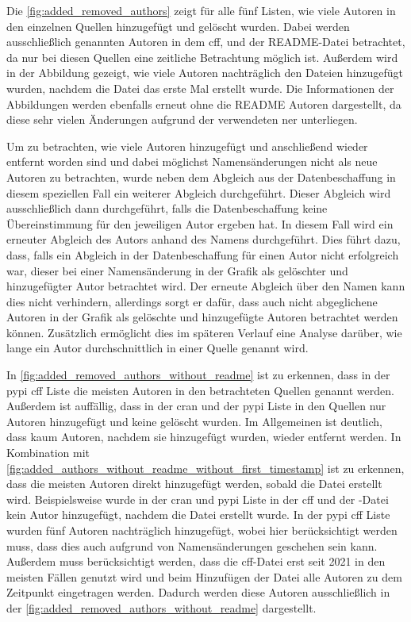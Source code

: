 Die \autoref{fig:added_removed_authors} zeigt für alle fünf Listen, wie viele Autoren in den einzelnen Quellen hinzugefügt und gelöscht wurden.
Dabei werden ausschließlich genannten Autoren in dem \gls{cff},  und der README-Datei betrachtet, da nur bei diesen Quellen eine zeitliche Betrachtung möglich ist.
Außerdem wird in der Abbildung gezeigt, wie viele Autoren nachträglich den Dateien hinzugefügt wurden, nachdem die Datei das erste Mal erstellt wurde.
Die Informationen der Abbildungen werden ebenfalls erneut ohne die README Autoren dargestellt, da diese sehr vielen Änderungen aufgrund der verwendeten \gls{ner} unterliegen.

Um zu betrachten, wie viele Autoren hinzugefügt und anschließend wieder entfernt worden sind und dabei möglichst Namensänderungen nicht als neue Autoren zu betrachten, wurde neben dem Abgleich aus der Datenbeschaffung in diesem speziellen Fall ein weiterer Abgleich durchgeführt.
Dieser Abgleich wird ausschließlich dann durchgeführt, falls die Datenbeschaffung keine Übereinstimmung für den jeweiligen Autor ergeben hat.
In diesem Fall wird ein erneuter Abgleich des Autors anhand des Namens durchgeführt.
Dies führt dazu, dass, falls ein Abgleich in der Datenbeschaffung für einen Autor nicht erfolgreich war, dieser bei einer Namensänderung in der Grafik als gelöschter und hinzugefügter Autor betrachtet wird.
Der erneute Abgleich über den Namen kann dies nicht verhindern, allerdings sorgt er dafür, dass auch nicht abgeglichene Autoren in der Grafik als gelöschte und hinzugefügte Autoren betrachtet werden können.
Zusätzlich ermöglicht dies im späteren Verlauf eine Analyse darüber, wie lange ein Autor durchschnittlich in einer Quelle genannt wird.

In \autoref{fig:added_removed_authors_without_readme} ist zu erkennen, dass in der \gls{pypi} \gls{cff} Liste die meisten Autoren in den betrachteten Quellen genannt werden.
Außerdem ist auffällig, dass in der \gls{cran} und der \gls{pypi} Liste in den Quellen nur Autoren hinzugefügt und keine gelöscht wurden.
Im Allgemeinen ist deutlich, dass kaum Autoren, nachdem sie hinzugefügt wurden, wieder entfernt werden.
In Kombination mit \autoref{fig:added_authors_without_readme_without_first_timestamp} ist zu erkennen, dass die meisten Autoren direkt hinzugefügt werden, sobald die Datei erstellt wird.
Beispielsweise wurde in der \gls{cran} und \gls{pypi} Liste in der \gls{cff} und der -Datei kein Autor hinzugefügt, nachdem die Datei erstellt wurde.
In der \gls{pypi} \gls{cff} Liste wurden fünf Autoren nachträglich hinzugefügt, wobei hier berücksichtigt werden muss, dass dies auch aufgrund von Namensänderungen geschehen sein kann.
Außerdem muss berücksichtigt werden, dass die \gls{cff}-Datei erst seit 2021 in den meisten Fällen genutzt wird und beim Hinzufügen der Datei alle Autoren zu dem Zeitpunkt eingetragen werden.
Dadurch werden diese Autoren ausschließlich in der \autoref{fig:added_removed_authors_without_readme} dargestellt.

